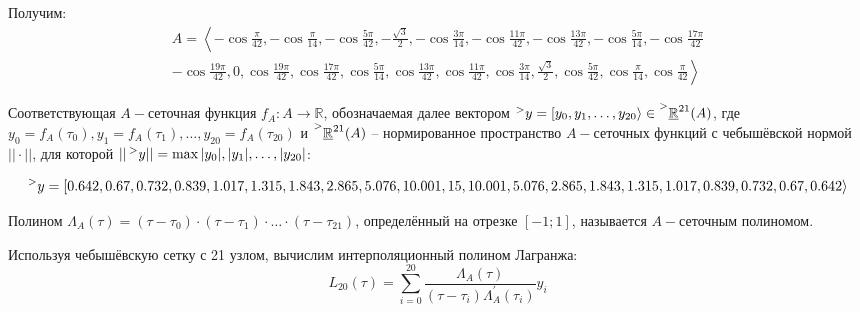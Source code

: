 \documentclass[14pt,a4paper]{scrartcl}
\begin{document}
Получим:
\begin{equation*}
	\begin{array}{l}{A=\left\langle-\cos \frac{\pi}{42},-\cos \frac{\pi}{14},-\cos \frac{5 \pi}{42},-\frac{\sqrt{3}}{2},-\cos \frac{3 \pi}{14},-\cos \frac{11 \pi}{42},-\cos \frac{13 \pi}{42},-\cos \frac{5 \pi}{14},-\cos \frac{17 \pi}{42}\right.} \\ {\left.-\cos \frac{19 \pi}{42}, 0, \cos \frac{19 \pi}{42}, \cos \frac{17 \pi}{42}, \cos \frac{5 \pi}{14}, \cos \frac{13 \pi}{42}, \cos \frac{11 \pi}{42}, \cos \frac{3 \pi}{14}, \frac{\sqrt{3}}{2}, \cos \frac{5 \pi}{42}, \cos \frac{\pi}{14}, \cos \frac{\pi}{42}\right\rangle}\end{array}
\end{equation*}

Соответствующая $A-$сеточная функция $f_A:A\rightarrow\mathbb{R}$, обозначаемая далее вектором $\prescript{>}{}{y} = \left[ y_0, y_1, \ldots, y_{20} \right> \in \prescript{>}{}{\underline{\mathbb{R}}^{21}}(A)$, где $y_0=f_A(\tau_0), y_1=f_A(\tau_1), \ldots, y_{20}=f_A(\tau_20)$ и $\prescript{>}{}{\underline{\mathbb{R}}^{21}}(A)$ -- нормированное пространство $A-$сеточных функций с чебышёвской нормой $||\cdot||$, для которой $||\prescript{>}{}{y}|| = \max{|y_0|, |y_1|, \ldots, |y_{20}|}$:

\begin{dmath*}
	\prescript{>}{}{y} = \left[ 0.642,0.67,0.732,0.839,1.017,1.315,1.843,2.865,5.076,10.001,\\
	15,10.001,5.076,2.865,1.843,1.315,1.017,0.839,0.732,0.67,0.642\right\rangle 
\end{dmath*}

Полином $\Lambda_A(\tau) = (\tau - \tau_0)\cdot(\tau - \tau_1)\cdot \ldots \cdot (\tau - \tau_{21})$, определённый на отрезке $[-1;1]$, называется $A-$сеточным полиномом.

Используя чебышёвскую сетку с 21 узлом, вычислим интерполяционный полином Лагранжа:
\begin{equation*}
L_{20}(\tau)=\sum_{i=0}^{20} \frac{\Lambda_{A}(\tau)}{\left(\tau-\tau_{i}\right) \Lambda_{A}^{\prime}\left(\tau_{i}\right)} y_{i}
\end{equation*}
\end{document}
